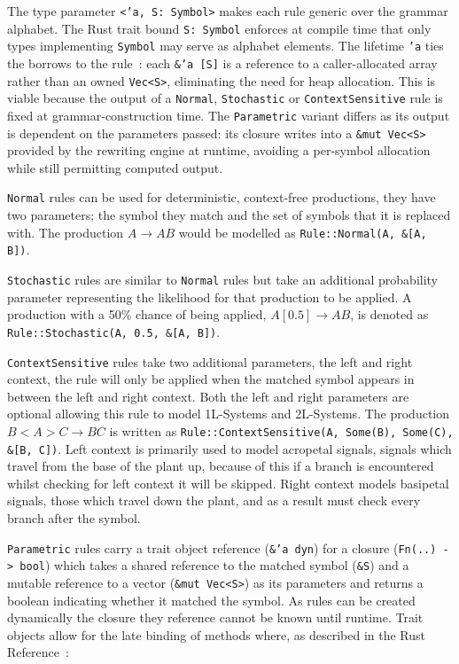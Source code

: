 The type parameter \texttt{<'a, S: Symbol>} makes each rule generic over the grammar alphabet. The Rust trait
bound \texttt{S: Symbol} enforces at compile time that only types implementing \texttt{Symbol} may serve as
alphabet elements. The lifetime \texttt{'a} ties the borrows to the rule~\cite{TraitLifetimeBounds}: each
\texttt{\&'a [S]} is a reference to a caller-allocated array rather than an owned \texttt{Vec<S>},
eliminating the need for heap allocation. This is viable because the output of a \texttt{Normal},
\texttt{Stochastic} or \texttt{ContextSensitive} rule is fixed at grammar-construction time. The
\texttt{Parametric} variant differs as its output is dependent on the parameters passed: its closure writes
into a \texttt{\&mut Vec<S>} provided by the rewriting engine at runtime, avoiding a per-symbol allocation
while still permitting computed output.

\medskip
\texttt{Normal} rules can be used for deterministic, context-free productions, they have two parameters; the
symbol they match and the set of symbols that it is replaced with. The production $A \rightarrow AB$ would be
modelled as \texttt{Rule::Normal(A, \&[A, B])}.

\medskip
\texttt{Stochastic} rules are similar to \texttt{Normal} rules but take an additional probability parameter
representing the likelihood for that production to be applied. A production with a 50\% chance of being
applied, $A[0.5] \rightarrow AB$, is denoted as \texttt{Rule::Stochastic(A, 0.5, \&[A, B])}.

\medskip
\texttt{ContextSensitive} rules take two additional parameters, the left and right context, the rule will
only be applied when the matched symbol appears in between the left and right context. Both the left and
right parameters are optional allowing this rule to model 1L-Systems and 2L-Systems. The production $B < A >
C \rightarrow BC$ is written as \texttt{Rule::ContextSensitive(A, Some(B), Some(C), \&[B, C])}. Left context
is primarily used to model acropetal signals, signals which travel from the base of the plant up, because of
this if a branch is encountered whilst checking for left context it will be skipped. Right context models
basipetal signals, those which travel down the plant, and as a result must check every branch after the symbol.

\medskip
\texttt{Parametric} rules carry a trait object reference (\texttt{\&'a dyn}) for a closure (\texttt{Fn(..) ->
bool}) which takes a shared reference to the matched symbol (\texttt{\&S}) and a mutable reference to a
vector (\texttt{\&mut Vec<S>}) as its parameters and returns a boolean indicating whether it matched the
symbol. As rules can be created dynamically the closure they reference cannot be known until runtime. Trait
objects allow for the late binding of methods where, as described in the Rust Reference~\cite{TraitObjectTypes}:

